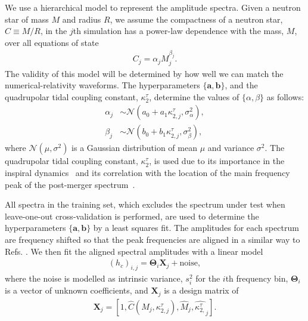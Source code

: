 \documentclass[../Thesis.tex]{subfiles}
\begin{document}
    We use a hierarchical model to represent the amplitude spectra. Given a neutron star of mass $M$ and radius $R$, we assume the compactness of a neutron star, $C\equiv M/R$, in the $j$th simulation has a power-law dependence with the mass, $M$, over all equations of state
    \begin{align}
        C_j = \alpha_j M_j^{\beta_j}. 
        \label{eq:Ccalc1}
    \end{align}
        The validity of this model will be determined by how well we can match the numerical-relativity waveforms. The hyperparameters $\{\mathbf{a},\mathbf{b}\}$, and the quadrupolar tidal coupling constant, $\kappa_2^\tau$, determine the values of $\{\alpha,\beta\}$ as follows:
    \begin{align}
        \alpha_j & \sim\mathcal{N}(a_0 + a_1 \kappa_{2,j}^\tau,\sigma_\alpha^2),\label{eq:alphacalc1} \\ 
        \beta_j & \sim\mathcal{N}(b_0 + b_1 \kappa_{2,j}^\tau,\sigma_\beta^2),
        \label{eq:betacalc1}
    \end{align}
        where $\mathcal{N}(\mu,\sigma^2)$ is a Gaussian distribution of mean $\mu$ and variance $\sigma^2$. The quadrupolar tidal coupling constant, $\kappa_2^\tau$, is used due to its importance in the inspiral dynamics~\cite{Damour2010,Read2013,Takami2014,Bernuzzi2015,Takami2015,Rezzolla2016} and its correlation with the location of the main frequency peak of the post-merger spectrum~\cite{Bauswein2012,Takami2014,Bernuzzi2015, Takami2015}.\par
        All spectra in the training set, which excludes the spectrum under test when leave-one-out cross-validation is performed, are used to determine the hyperparameters $\{\mathbf{a},\mathbf{b}\}$ by a least squares fit. The amplitudes for each spectrum are frequency shifted so that the peak frequencies are aligned in a similar way to Refs. \cite{Clark2016postmerger,Bose2018}.  We then fit the aligned spectral amplitudes with a linear model
    \begin{align}
        (h_c)_{i,j} = \boldsymbol{\Theta}_{i}\mathbf{X}_j + \text{noise}, 
        \label{eq:GenerateWaveform1}
    \end{align}
        where the noise is modelled as intrinsic variance, $s_i^2$ for the $i$th frequency bin, $\boldsymbol{\Theta}_i$ is a vector of unknown coefficients,  and $\mathbf{X}_j$ is a design matrix of 
    \begin{align}
        \mathbf{X}_j=[1,\widehat{C}(M_j,\kappa^\tau_{2,j}),\widehat{M}_j,\widehat{\kappa^\tau_{2,}}_{j}]. \label{eq:DesignMatrix1}
    \end{align}
\end{document}
